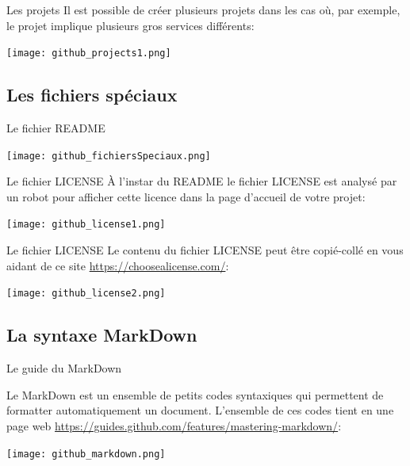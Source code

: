\documentclass{beamer}
\begin{document}
\begin{frame}{Les projets}
Il est possible de créer plusieurs projets dans les cas où, par exemple, le projet implique plusieurs gros services différents:
\begin{center}
	\texttt{[image: github\_projects1.png]}
\end{center}
\end{frame}



\subsection{Les fichiers spéciaux}
\begin{frame}{Le fichier README}
\begin{center}
	\texttt{[image: github\_fichiersSpeciaux.png]}
\end{center}
\end{frame}


\begin{frame}{Le fichier LICENSE}
À l'instar du README le fichier LICENSE est analysé par un robot pour afficher cette licence dans la page d'accueil de votre projet:
\begin{center}
	\texttt{[image: github\_license1.png]}
\end{center}
\end{frame}


\begin{frame}{Le fichier LICENSE}
Le contenu du fichier LICENSE peut être copié-collé en vous aidant de ce site \url{https://choosealicense.com/}:
\begin{center}
	\texttt{[image: github\_license2.png]}
\end{center}
\end{frame}


\subsection{La syntaxe MarkDown}
\begin{frame}{Le guide du MarkDown}

Le MarkDown est un ensemble de petits codes syntaxiques qui permettent de formatter automatiquement un document. L'ensemble de ces codes tient en une page web \url{https://guides.github.com/features/mastering-markdown/}: 
\begin{center}
	\texttt{[image: github\_markdown.png]}
\end{center}
\end{frame}
\end{document}
